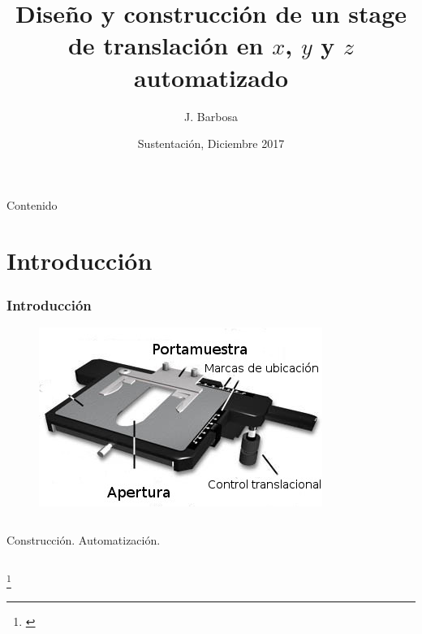 \documentclass{beamer}
\title[Mauscope] %
{Diseño y construcción de un stage de translación en $x$, $y$ y $z$ automatizado}
\author[J. Barbosa] %
{J. Barbosa\inst{1}}
\institute[] %
{
  \inst{1}%
  Departamento de Física\\
  Universidad de los Andes
}
\date[Diciembre 2017] %
{Sustentaci\'on, Diciembre 2017}
\newcommand\blfootnote[1]{%
  \begingroup
  \renewcommand\thefootnote{}\footnote{#1}%
  \addtocounter{footnote}{-1}%
  \endgroup
}
\begin{document}
    \frame{\titlepage}
    
    \begin{frame}{Contenido}
        \tableofcontents
    \end{frame}
    
    \section{Introducción}
    \begin{frame}
        \frametitle{Introducción}
         \begin{figure}
            \centering
            \includegraphics[width=0.5\linewidth]{figures/stage1.jpg}
        \end{figure}
        
        \begin{columns}
                Construcción.
                Automatización.
        \end{columns}
        \blfootnote{\cite{Abramowitz2015}}
    \end{frame}
    
\end{document}
